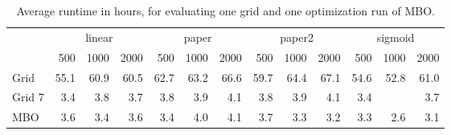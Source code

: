\begin{table}

\caption{\label{tab:table_time}Average runtime in hours, for evaluating one grid and one optimization run of MBO.}
\centering
\begin{tabular}[t]{lrrrrrrrrrrrr}
\toprule
\multicolumn{1}{c}{ } & \multicolumn{3}{c}{linear} & \multicolumn{3}{c}{paper} & \multicolumn{3}{c}{paper2} & \multicolumn{3}{c}{sigmoid} \\
\cmidrule(l{3pt}r{3pt}){2-4} \cmidrule(l{3pt}r{3pt}){5-7} \cmidrule(l{3pt}r{3pt}){8-10} \cmidrule(l{3pt}r{3pt}){11-13}
 & 500 & 1000 & 2000 & 500 & 1000 & 2000 & 500 & 1000 & 2000 & 500 & 1000 & 2000\\
\midrule
Grid & 55.1 & 60.9 & 60.5 & 62.7 & 63.2 & 66.6 & 59.7 & 64.4 & 67.1 & 54.6 & 52.8 & 61.0\\
Grid 7 & 3.4 & 3.8 & 3.7 & 3.8 & 3.9 & 4.1 & 3.8 & 3.9 & 4.1 & 3.4 &  & 3.7\\
MBO & 3.6 & 3.4 & 3.6 & 3.4 & 4.0 & 4.1 & 3.7 & 3.3 & 3.2 & 3.3 & 2.6 & 3.1\\
\bottomrule
\end{tabular}
\end{table}
